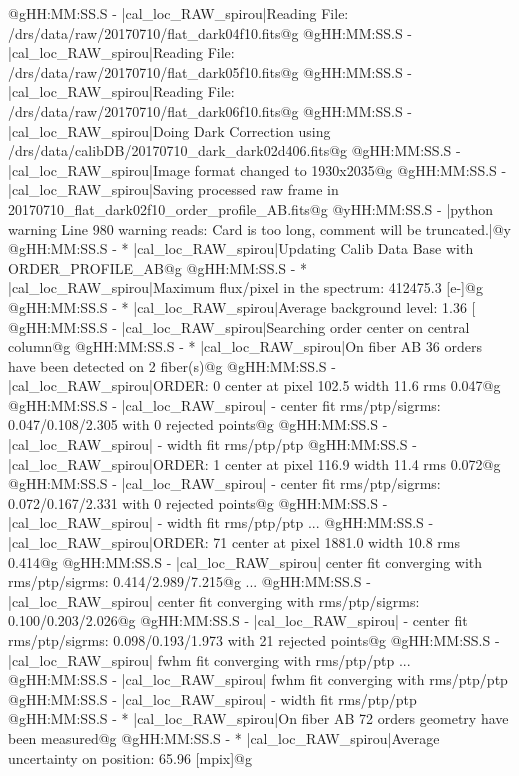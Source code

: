 \begin{cmdboxprintspecial}[fontupper=\tiny, fontlower=\tiny]
@gHH:MM:SS.S -   |cal_loc_RAW_spirou|Reading File: /drs/data/raw/20170710/flat_dark04f10.fits@g
@gHH:MM:SS.S -   |cal_loc_RAW_spirou|Reading File: /drs/data/raw/20170710/flat_dark05f10.fits@g
@gHH:MM:SS.S -   |cal_loc_RAW_spirou|Reading File: /drs/data/raw/20170710/flat_dark06f10.fits@g
@gHH:MM:SS.S -   |cal_loc_RAW_spirou|Doing Dark Correction using /drs/data/calibDB/20170710_dark_dark02d406.fits@g
@gHH:MM:SS.S -   |cal_loc_RAW_spirou|Image format changed to 1930x2035@g
@gHH:MM:SS.S -   |cal_loc_RAW_spirou|Saving processed raw frame in 20170710_flat_dark02f10_order_profile_AB.fits@g
@yHH:MM:SS.S - \@ |python warning Line 980  warning reads: Card is too long, comment will be truncated.|@y
@gHH:MM:SS.S - * |cal_loc_RAW_spirou|Updating Calib Data Base with ORDER_PROFILE_AB@g
@gHH:MM:SS.S - * |cal_loc_RAW_spirou|Maximum flux/pixel in the spectrum: 412475.3 [e-]@g
@gHH:MM:SS.S - * |cal_loc_RAW_spirou|Average background level: 1.36 [%
@gHH:MM:SS.S -   |cal_loc_RAW_spirou|Searching order center on central column@g
@gHH:MM:SS.S - * |cal_loc_RAW_spirou|On fiber AB 36 orders have been detected on 2 fiber(s)@g
@gHH:MM:SS.S -   |cal_loc_RAW_spirou|ORDER: 0 center at pixel 102.5 width 11.6 rms 0.047@g
@gHH:MM:SS.S -   |cal_loc_RAW_spirou| - center fit rms/ptp/sigrms: 0.047/0.108/2.305 with 0 rejected points@g
@gHH:MM:SS.S -   |cal_loc_RAW_spirou| - width  fit rms/ptp/ptp%
@gHH:MM:SS.S -   |cal_loc_RAW_spirou|ORDER: 1 center at pixel 116.9 width 11.4 rms 0.072@g
@gHH:MM:SS.S -   |cal_loc_RAW_spirou| - center fit rms/ptp/sigrms: 0.072/0.167/2.331 with 0 rejected points@g
@gHH:MM:SS.S -   |cal_loc_RAW_spirou| - width  fit rms/ptp/ptp%
...
@gHH:MM:SS.S -   |cal_loc_RAW_spirou|ORDER: 71 center at pixel 1881.0 width 10.8 rms 0.414@g
@gHH:MM:SS.S -   |cal_loc_RAW_spirou|      center fit converging with rms/ptp/sigrms: 0.414/2.989/7.215@g
...
@gHH:MM:SS.S -   |cal_loc_RAW_spirou|      center fit converging with rms/ptp/sigrms: 0.100/0.203/2.026@g
@gHH:MM:SS.S -   |cal_loc_RAW_spirou| - center fit rms/ptp/sigrms: 0.098/0.193/1.973 with 21 rejected points@g
@gHH:MM:SS.S -   |cal_loc_RAW_spirou|      fwhm fit converging with rms/ptp/ptp%
...
@gHH:MM:SS.S -   |cal_loc_RAW_spirou|      fwhm fit converging with rms/ptp/ptp%
@gHH:MM:SS.S -   |cal_loc_RAW_spirou| - width  fit rms/ptp/ptp%
@gHH:MM:SS.S - * |cal_loc_RAW_spirou|On fiber AB 72 orders geometry have been measured@g
@gHH:MM:SS.S - * |cal_loc_RAW_spirou|Average uncertainty on position: 65.96 [mpix]@g

\end{cmdboxprintspecial}
